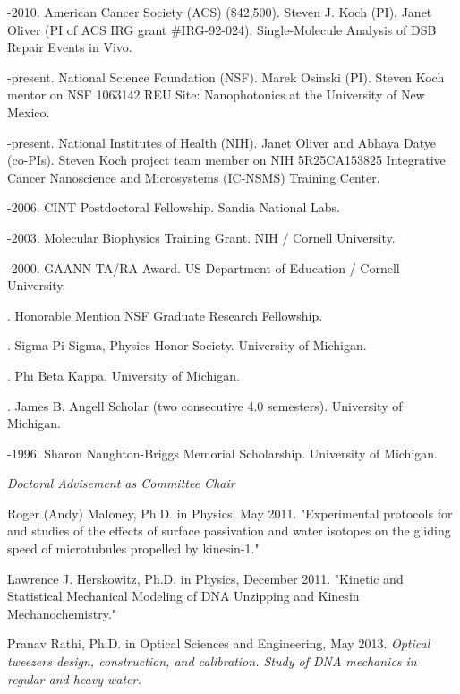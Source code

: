 \documentclass[11pt]{article}
\begin{document}
-2010. American Cancer Society (\textsc{ACS}) (\$42,500).  Steven J. Koch (PI), Janet Oliver (PI of ACS IRG grant \#IRG-92-024). Single-Molecule Analysis of DSB Repair Events in Vivo.

-present. National Science Foundation (\textsc{NSF}). Marek Osinski (PI). Steven Koch mentor on NSF 1063142 REU Site: Nanophotonics at the University of New Mexico.

-present. National Institutes of Health (\textsc{NIH}). Janet Oliver and Abhaya Datye (co-PIs). Steven Koch project team member on NIH 5R25CA153825 Integrative Cancer Nanoscience and Microsystems (IC-NSMS) Training Center.

-2006. CINT Postdoctoral Fellowship.  Sandia National Labs.

-2003. Molecular Biophysics Training Grant. NIH / Cornell University.

-2000. GAANN TA/RA Award.  US Department of Education / Cornell University.

. Honorable Mention NSF Graduate Research Fellowship.

. Sigma Pi Sigma, Physics Honor Society. University of Michigan.

. Phi Beta Kappa. University of Michigan.

. James B. Angell Scholar (two consecutive 4.0 semesters). University of Michigan.

-1996. Sharon Naughton-Briggs Memorial Scholarship.  University of Michigan.

\bigskip 

\newpage

\medskip
{}

\noindent\emph{Doctoral Advisement as Committee Chair \vspace{0.01in}}

\ind Roger (Andy) Maloney, Ph.D. in Physics, May 2011. "Experimental protocols for and studies of the effects of surface passivation and water isotopes on the gliding speed of microtubules propelled by kinesin-1."

\ind Lawrence J. Herskowitz, Ph.D. in Physics, December 2011. "Kinetic and Statistical Mechanical Modeling of DNA Unzipping and Kinesin Mechanochemistry."

\ind Pranav Rathi, Ph.D. in Optical Sciences and Engineering, May 2013.  \emph{Optical tweezers design, construction, and calibration. Study of DNA mechanics in regular and heavy water.}
\end{document}
